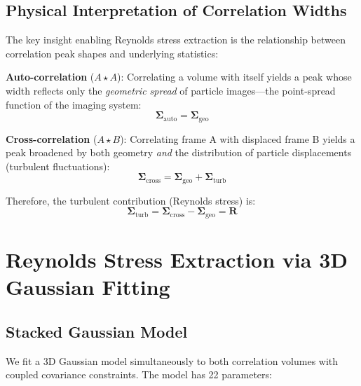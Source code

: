 \documentclass[11pt,a4paper]{article}
\begin{document}
\subsection{Physical Interpretation of Correlation Widths}

The key insight enabling Reynolds stress extraction is the relationship between correlation peak shapes and underlying statistics:

\textbf{Auto-correlation} ($A \star A$): Correlating a volume with itself yields a peak whose width reflects only the \textit{geometric spread} of particle images---the point-spread function of the imaging system:
\begin{equation}
    \bm{\Sigma}_{\text{auto}} = \bm{\Sigma}_{\text{geo}}
\end{equation}

\textbf{Cross-correlation} ($A \star B$): Correlating frame A with displaced frame B yields a peak broadened by both geometry \textit{and} the distribution of particle displacements (turbulent fluctuations):
\begin{equation}
    \bm{\Sigma}_{\text{cross}} = \bm{\Sigma}_{\text{geo}} + \bm{\Sigma}_{\text{turb}}
\end{equation}

Therefore, the turbulent contribution (Reynolds stress) is:
\begin{equation}
    \boxed{\bm{\Sigma}_{\text{turb}} = \bm{\Sigma}_{\text{cross}} - \bm{\Sigma}_{\text{geo}} = \mathbf{R}}
\end{equation}

\section{Reynolds Stress Extraction via 3D Gaussian Fitting}

\subsection{Stacked Gaussian Model}

We fit a 3D Gaussian model simultaneously to both correlation volumes with coupled covariance constraints. The model has 22 parameters:
\end{document}

